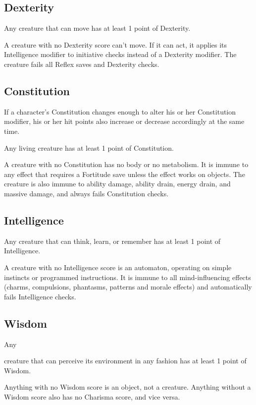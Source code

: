 \subsection{Dexterity}

Any creature that can move
has at least 1 point of Dexterity.

A creature with no Dexterity score can't move. If it can act, it applies
its Intelligence modifier to initiative checks instead of a Dexterity
modifier. The creature fails all Reflex saves and Dexterity checks.

\subsection{Constitution} 

If a character's Constitution changes enough
to alter his or her Constitution modifier, his or her hit points also
increase or decrease accordingly at the same time.

Any living creature has at least 1 point of Constitution.

A creature with no Constitution has no body or no metabolism. It is immune
to any effect that requires a Fortitude save unless the effect works on
objects. The creature is also immune to ability damage, ability drain,
energy drain, and massive damage, and always fails Constitution checks.

\subsection{Intelligence}

Any creature that can think, learn, or remember
has at least 1 point of Intelligence.

A creature with no Intelligence score is an automaton, operating on simple
instincts or programmed instructions. It is immune to all mind-influencing
effects (charms, compulsions, phantasms, patterns and morale effects)
and automatically fails Intelligence checks.

\subsection{Wisdom} Any

creature that can perceive its environment in any fashion has at least
1 point of Wisdom.

Anything with no Wisdom score is an object, not a creature. Anything
without a Wisdom score also has no Charisma score, and vice versa.

